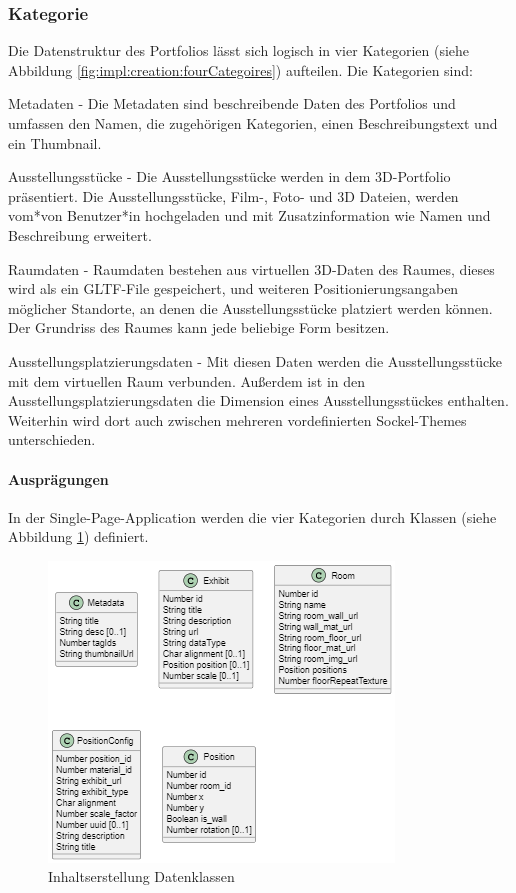 \subsubsection{Kategorie}
\label{sec:wizard:categories}
Die Datenstruktur des Portfolios lässt sich logisch in vier Kategorien (siehe Abbildung \ref{fig:impl:creation:fourCategoires}) aufteilen. 
Die Kategorien sind:
\begin{compactitem}
\item Metadaten - Die Metadaten sind beschreibende Daten des Portfolios und umfassen den Namen, die zugehörigen Kategorien, einen  Beschreibungstext und ein Thumbnail.
\item Ausstellungsstücke - Die Ausstellungsstücke werden in dem 3D-Portfolio präsentiert. Die Ausstellungsstücke, Film-, Foto- und 3D Dateien,  werden vom*von Benutzer*in hochgeladen und mit Zusatzinformation wie Namen und Beschreibung erweitert. 
\item Raumdaten - Raumdaten bestehen aus virtuellen 3D-Daten des Raumes, dieses wird als ein GLTF-File gespeichert, und weiteren Positionierungsangaben möglicher Standorte, an denen die Ausstellungsstücke platziert werden können. Der Grundriss des Raumes kann jede beliebige Form besitzen. 
\item Ausstellungsplatzierungsdaten - Mit diesen Daten werden die Ausstellungsstücke mit dem virtuellen Raum verbunden. Außerdem ist in den Ausstellungsplatzierungsdaten die Dimension eines Ausstellungsstückes enthalten. Weiterhin wird dort auch zwischen mehreren vordefinierten Sockel-Themes unterschieden. \end{compactitem}

\paragraph{Ausprägungen}
In der Single-Page-Application werden die vier Kategorien durch Klassen (siehe Abbildung \ref{fig:impl:creation:dataclasses}) definiert. 

\begin{figure}[ht]
    \centering
    \includegraphics[scale=0.9]{pics/content_creation_classes.png}
    \caption{Inhaltserstellung Datenklassen}
    \label{fig:impl:creation:dataclasses}
\end{figure}

